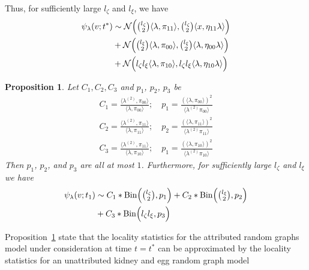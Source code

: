 \documentclass[draftcls]{IEEEtran}
\newtheorem{proposition}[theorem]{Proposition}
\theoremstyle{definition}
\begin{document}
Thus, for sufficiently large $l_{\zeta}$ and $l_{\xi}$, we have
\begin{equation}
  \begin{split}
 \psi_{\lambda}(v;t^{*}) & \sim  \mathcal{N}\Bigl(\tbinom{l_\zeta}{2}
 \langle \lambda, \pi_{11} \rangle,
  \tbinom{l_\zeta}{2} \langle x, \eta_{11} \lambda \rangle \Bigr) \\ &+ 
  \mathcal{N}\Bigl(\tbinom{l_\xi}{2} \langle \lambda, \pi_{00} \rangle,
  \tbinom{l_\xi}{2} \langle \lambda, \eta_{00} \lambda \rangle \Bigr) \\ &+ 
  \mathcal{N}\Bigl(l_\zeta l_\xi \langle \lambda, \pi_{10} \rangle,
  l_\zeta l_\xi \langle \lambda, \eta_{10} \lambda \rangle \Bigr)
\end{split}
\end{equation}
\begin{proposition}
  \label{prop:2}
  Let $C_1, C_2, C_3$ and $p_1$, $p_2$, $p_3$ be 
  \begin{gather*}
C_1 = \tfrac{\langle \lambda^{(2)}, \pi_{00} \rangle}{\langle \lambda,
    \pi_{00}\rangle}; \quad p_1 = \tfrac{(\langle \lambda, \pi_{00}
    \rangle)^{2}}{\langle \lambda^{(2)} \pi_{00} \rangle} \\
C_2 = \tfrac{\langle \lambda^{(2)}, \pi_{11} \rangle}{\langle \lambda,
    \pi_{11}\rangle}; \quad p_2 = \tfrac{(\langle \lambda, \pi_{11}
    \rangle)^{2}}{\langle \lambda^{(2)} \pi_{11} \rangle} \\
C_3 = \tfrac{\langle \lambda^{(2)}, \pi_{11} \rangle}{\langle \lambda,
    \pi_{10}\rangle}; \quad p_1 = \tfrac{(\langle \lambda, \pi_{10}
    \rangle)^{2}}{\langle \lambda^{(2)} \pi_{10} \rangle} 
\end{gather*}
  Then $p_1$, $p_2$, and $p_3$ are all at most $1$. Furthermore, for
  sufficiently large $l_\zeta$ and $l_\xi$ we have
\begin{equation*}
  \begin{split}
 \psi_{\lambda}(v;t_1) &\sim C_1 *  
 \mathrm{Bin}\Bigl(\tbinom{l_\zeta}{2}, p_1\Bigr) + C_2 *  
 \mathrm{Bin}\Bigl(\tbinom{l_\xi}{2}, p_2\Bigr) \\ &+ C_3 *
 \mathrm{Bin}\Bigl(l_\zeta l_\xi, p_3\Bigr)
 \end{split}
\end{equation*} 
\end{proposition}
Proposition~\ref{prop:2} state that the locality statistics
for the attributed random graphs model under consideration at time $t
= t^{*}$ can be approximated by the locality
statistics for an unattributed kidney and egg random graph model
\end{document}
